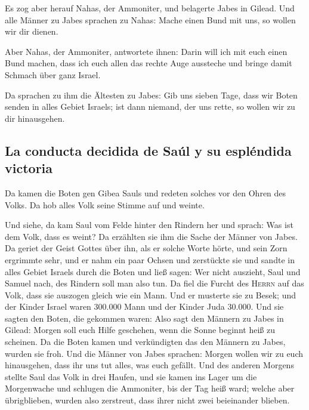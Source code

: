  Es zog aber herauf Nahas, der Ammoniter, und belagerte
Jabes in Gilead. Und alle Männer zu Jabes sprachen zu Nahas: Mache einen
Bund mit uns, so wollen wir dir dienen.

 Aber Nahas, der Ammoniter, antwortete ihnen: Darin will
ich mit euch einen Bund machen, dass ich euch allen das rechte Auge
aussteche und bringe damit Schmach über ganz Israel.

 Da sprachen zu ihm die Ältesten zu Jabes: Gib uns sieben
Tage, dass wir Boten senden in alles Gebiet Israels; ist dann niemand,
der uns rette, so wollen wir zu dir hinausgehen.

\hypertarget{la-conducta-decidida-de-sauxfal-y-su-espluxe9ndida-victoria}{%
\subsection{La conducta decidida de Saúl y su espléndida
victoria}\label{la-conducta-decidida-de-sauxfal-y-su-espluxe9ndida-victoria}}

 Da kamen die Boten gen Gibea Sauls und redeten solches
vor den Ohren des Volks. Da hob alles Volk seine Stimme auf und weinte.

 Und siehe, da kam Saul vom Felde hinter den Rindern her
und sprach: Was ist dem Volk, dass es weint? Da erzählten sie ihm die
Sache der Männer von Jabes.  Da geriet der Geist Gottes
über ihn, als er solche Worte hörte, und sein Zorn ergrimmte sehr,
 und er nahm ein paar Ochsen und zerstückte sie und sandte
in alles Gebiet Israels durch die Boten und ließ sagen: Wer nicht
auszieht, Saul und Samuel nach, des Rindern soll man also tun. Da fiel
die Furcht des \textsc{Herrn} auf das Volk, dass sie auszogen gleich wie
ein Mann.  Und er musterte sie zu Besek; und der Kinder
Israel waren 300.000 Mann und der Kinder Juda 30.000.  Und
sie sagten den Boten, die gekommen waren: Also sagt den Männern zu Jabes
in Gilead: Morgen soll euch Hilfe geschehen, wenn die Sonne beginnt heiß
zu scheinen. Da die Boten kamen und verkündigten das den Männern zu
Jabes, wurden sie froh.  Und die Männer von Jabes
sprachen: Morgen wollen wir zu euch hinausgehen, dass ihr uns tut alles,
was euch gefällt.  Und des anderen Morgens stellte Saul
das Volk in drei Haufen, und sie kamen ins Lager um die Morgenwache und
schlugen die Ammoniter, bis der Tag heiß ward; welche aber übrigblieben,
wurden also zerstreut, dass ihrer nicht zwei beieinander blieben.

